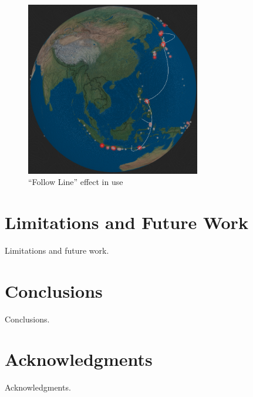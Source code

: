 \documentclass[conference]{acmsiggraph}
\begin{document}
\begin{figure}
  \centering
  \includegraphics[width=3.0in]{images/follow_line}
  \caption{``Follow Line'' effect in use}
\end{figure}

\section{Limitations and Future Work}

Limitations and future work.


\section{Conclusions}

Conclusions.

\section{Acknowledgments}

Acknowledgments.



\end{document}
